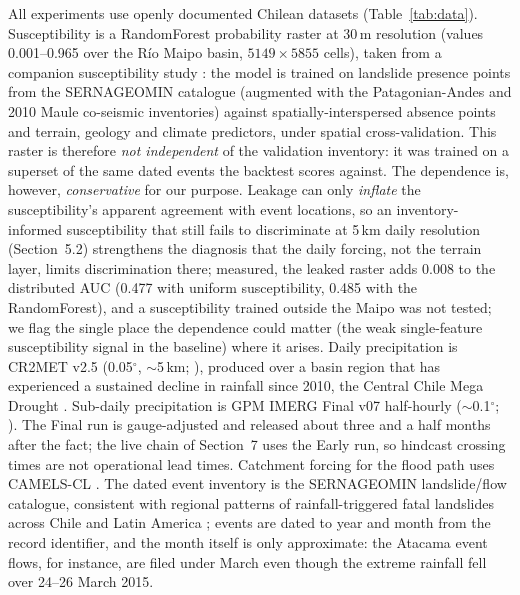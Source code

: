 \documentclass[authoryear,preprint,review,12pt]{elsarticle}
\begin{document}
All experiments use openly documented Chilean datasets (Table~\ref{tab:data}).
Susceptibility is a RandomForest probability raster at 30\,m resolution (values
0.001--0.965 over the R\'io Maipo basin, $5149\times5855$ cells), taken from a
companion susceptibility study \citep{parra2026transfer}: the model is trained on landslide presence points
from the SERNAGEOMIN catalogue (augmented with the Patagonian-Andes and 2010 Maule
co-seismic inventories) against spatially-interspersed absence points and terrain,
geology and climate predictors, under spatial cross-validation. This raster is
therefore \emph{not independent} of the validation inventory: it was trained on a
superset of the same dated events the backtest scores against. The dependence is,
however, \emph{conservative} for our purpose. Leakage can only \emph{inflate} the
susceptibility's apparent agreement with event locations, so an inventory-informed
susceptibility that still fails to discriminate at 5\,km daily resolution
(Section~5.2) strengthens the diagnosis that the daily forcing, not the terrain
layer, limits discrimination there; measured, the leaked raster adds 0.008 to the
distributed AUC (0.477 with uniform susceptibility, 0.485 with the RandomForest),
and a susceptibility trained outside the Maipo was not tested; we flag the single place the dependence could matter (the weak single-feature
susceptibility signal in the baseline) where it arises. Daily
precipitation is CR2MET v2.5 (0.05$^\circ$, $\sim$5\,km; \citealp{boisier2018cr2met,boisier2023cr2met}), produced over a basin
region that has experienced a sustained decline in rainfall since 2010, the
Central Chile Mega Drought \citep{garreaud2019,boisier2018}.
Sub-daily precipitation is GPM IMERG Final v07 half-hourly ($\sim$0.1$^\circ$;
\citealp{huffman2023,tan2019}). The Final run is gauge-adjusted and released about
three and a half months after the fact; the live chain of Section~7 uses the Early
run, so hindcast crossing times are not operational lead times. Catchment forcing for the flood path uses CAMELS-CL
\citep{alvarez2018}. The dated event inventory is the SERNAGEOMIN
landslide/flow catalogue, consistent with regional patterns of rainfall-triggered
fatal landslides across Chile and Latin America \citep{sepulveda2015}; events are dated to year and month from the record
identifier, and the month itself is only approximate: the Atacama event flows,
for instance, are filed under March even though the extreme rainfall fell over
24--26 March 2015.
\end{document}
